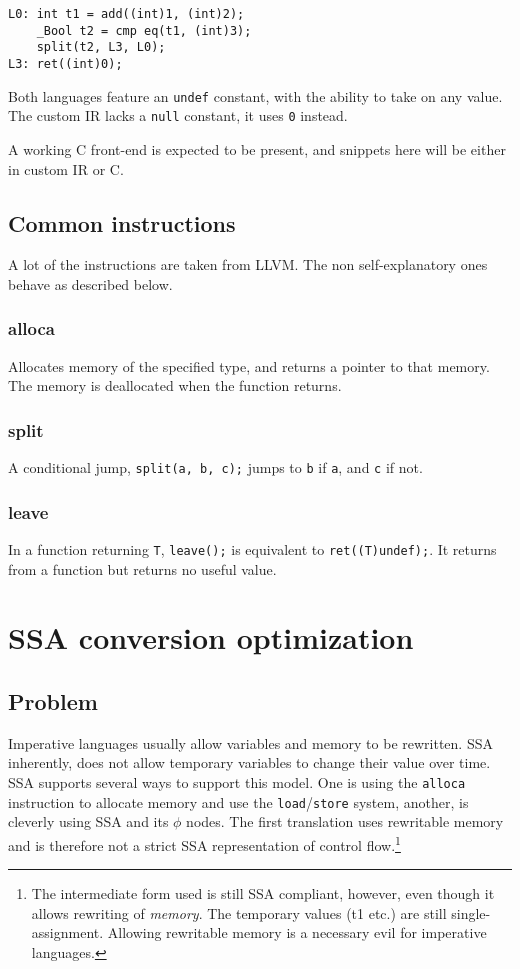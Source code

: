 \documentclass[12pt, a4paper]{article}
\begin{document}
\begin{lstlisting}
L0:	int t1 = add((int)1, (int)2);
	_Bool t2 = cmp eq(t1, (int)3);
	split(t2, L3, L0);
L3:	ret((int)0);
\end{lstlisting}

Both languages feature an \verb+undef+ constant, with the ability to take on any
value. The custom IR lacks a \verb+null+ constant, it uses \verb+0+ instead.

A working C front-end is expected to be present, and snippets here will be 
either in custom IR or C.

\subsection{Common instructions}
A lot of the instructions are taken from LLVM. The non self-explanatory ones
behave as described below.
\subsubsection{alloca}
Allocates memory of the specified type, and returns a pointer to that memory.
The memory is deallocated when the function returns.
\subsubsection{split}
A conditional jump, \verb+split(a, b, c);+ jumps to \verb+b+ if \verb+a+, and
\verb+c+ if not.
\subsubsection{leave}
In a function returning \verb+T+, \verb+leave();+ is equivalent to
\verb+ret((T)undef);+. It returns from a function but returns no useful value.

  \section{SSA conversion optimization}
  \subsection{Problem}
Imperative languages usually allow variables and memory to be rewritten. SSA 
inherently, does not allow temporary variables to change their value over time. 
SSA supports several ways to support this model. One is using the \verb+alloca+
instruction to allocate memory and use the \verb+load+/\verb+store+ system,
another, is cleverly using SSA and its $\phi$ nodes. The first translation uses
rewritable memory and is therefore not a strict SSA representation of control
flow.\footnote{The intermediate form used is still SSA compliant, however, even though it
allows rewriting of \textit{memory}. The temporary values (t1 etc.) are
still single-assignment. Allowing rewritable memory is a necessary evil for
imperative languages.}
\end{document}
